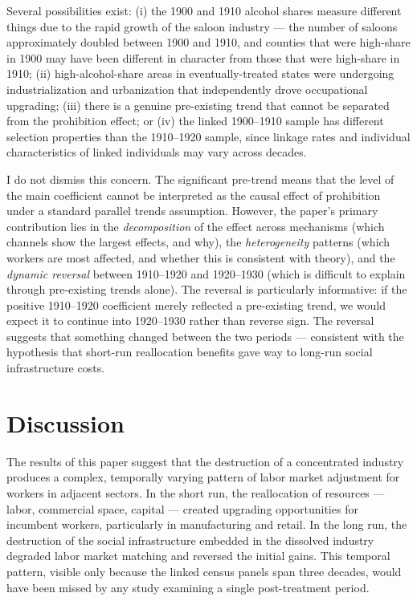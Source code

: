 \documentclass[12pt]{article}
\begin{document}
Several possibilities exist: (i) the 1900 and 1910 alcohol shares measure different things due to the rapid growth of the saloon industry --- the number of saloons approximately doubled between 1900 and 1910, and counties that were high-share in 1900 may have been different in character from those that were high-share in 1910; (ii) high-alcohol-share areas in eventually-treated states were undergoing industrialization and urbanization that independently drove occupational upgrading; (iii) there is a genuine pre-existing trend that cannot be separated from the prohibition effect; or (iv) the linked 1900--1910 sample has different selection properties than the 1910--1920 sample, since linkage rates and individual characteristics of linked individuals may vary across decades.

I do not dismiss this concern. The significant pre-trend means that the level of the main coefficient cannot be interpreted as the causal effect of prohibition under a standard parallel trends assumption. However, the paper's primary contribution lies in the \emph{decomposition} of the effect across mechanisms (which channels show the largest effects, and why), the \emph{heterogeneity} patterns (which workers are most affected, and whether this is consistent with theory), and the \emph{dynamic reversal} between 1910--1920 and 1920--1930 (which is difficult to explain through pre-existing trends alone). The reversal is particularly informative: if the positive 1910--1920 coefficient merely reflected a pre-existing trend, we would expect it to continue into 1920--1930 rather than reverse sign. The reversal suggests that something changed between the two periods --- consistent with the hypothesis that short-run reallocation benefits gave way to long-run social infrastructure costs.


\section{Discussion}
\label{sec:discussion}

The results of this paper suggest that the destruction of a concentrated industry produces a complex, temporally varying pattern of labor market adjustment for workers in adjacent sectors. In the short run, the reallocation of resources --- labor, commercial space, capital --- created upgrading opportunities for incumbent workers, particularly in manufacturing and retail. In the long run, the destruction of the social infrastructure embedded in the dissolved industry degraded labor market matching and reversed the initial gains. This temporal pattern, visible only because the linked census panels span three decades, would have been missed by any study examining a single post-treatment period.
\end{document}
